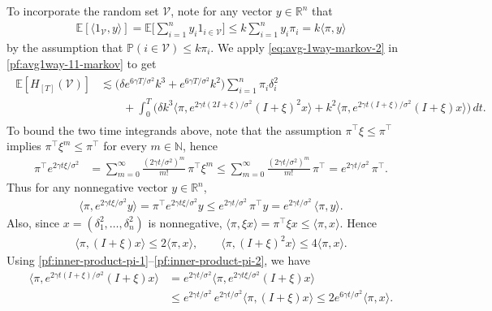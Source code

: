 \documentclass[11pt,reqno]{amsart}
\numberwithin{equation}{section}
\theoremstyle{definition}
\def\E{{\mathbb E}}
\def\N{{\mathbb N}}
\def\PP{{\mathbb P}}
\def\R{{\mathbb R}}
\def\V{{\mathcal V}}
\begin{document}
To incorporate the random set $\V$, note for any vector $y \in \R^n$ that
	\begin{align} \label{eq:avg-1way-markov-2}
		\E[\langle 1_{\V}, y \rangle ] = \E\Big[\sum_{i=1}^n y_i 1_{i\in\V}\Big] \le k \sum_{i=1}^n y_i \pi_i
		=k\langle\pi, y \rangle
	\end{align}
	by the assumption that $\PP(i\in\V)\le k\pi_i$.
	We apply \eqref{eq:avg-1way-markov-2} in \eqref{pf:avg1way-11-markov} to get
	\begin{align}\label{pf:avg-1way-precol-markov}
		\begin{split}
			\E[H_{[T]}(\V)]
			&\lesssim \big(\delta e^{6\gamma T/\sigma^2} k^3 + e^{6\gamma T/\sigma^2} k^2\big)  \sum_{i=1}^n \pi_i \delta_i^2\\
			&\qquad +  \int_0^T \bigg( \delta k^3 \big\langle \pi , e^{ 2\gamma  t (2I+\xi)/\sigma^2}(I+\xi)^2 x\big\rangle + k^2\big\langle \pi,  e^{2\gamma  t (I+\xi)/\sigma^2}(I+\xi) x \big\rangle \bigg)\,dt.
		\end{split}
	\end{align}
	To bound the two time integrands above, note that the assumption $\pi^\top \xi \le \pi^\top$ implies $\pi^\top \xi^m \le \pi^\top$ for every $m \in \N$, hence 
		\begin{align*}
			\pi^\top e^{2\gamma t \xi/\sigma^2}
			&= \sum_{m=0}^{\infty} \frac{(2\gamma t/\sigma^2)^m}{m!}\,\pi^\top \xi^m
			\le \sum_{m=0}^{\infty} \frac{(2\gamma t/\sigma^2)^m}{m!}\,\pi^\top
			= e^{2\gamma t/\sigma^2}\,\pi^\top.
		\end{align*}
		Thus for any nonnegative vector $y \in \R^n$, 
		\begin{align} \label{pf:inner-product-pi-1}
			\langle \pi, e^{2\gamma t \xi/\sigma^2} y \rangle
			= \pi^\top e^{2\gamma t \xi/\sigma^2} y
			\le e^{2\gamma t/\sigma^2}\,\pi^\top y
			= e^{2\gamma t/\sigma^2}\,\langle \pi, y \rangle.
		\end{align}
		Also, since $x=(\delta^2_1,\ldots,\delta^2_n)$ is nonnegative, $\langle \pi , \xi x\rangle  =  \pi^\top \xi x  \le \langle \pi, x \rangle$. Hence
		\begin{align}  \label{pf:inner-product-pi-2}
			\langle \pi, (I + \xi) x \rangle \le 2 \langle \pi, x \rangle,
			\qquad
			\langle \pi, (I+\xi)^2 x\rangle \le 4\langle \pi, x\rangle.
		\end{align} 
		Using \eqref{pf:inner-product-pi-1}--\eqref{pf:inner-product-pi-2}, we have
		\begin{align*}
			\big\langle \pi,  e^{2\gamma  t (I+\xi)/\sigma^2}(I+\xi) x \big\rangle
			&= e^{2\gamma t/\sigma^2}\big\langle \pi,  e^{2\gamma  t \xi/\sigma^2}(I+\xi) x \big\rangle \\
			&\le e^{2\gamma t/\sigma^2}\,e^{2\gamma t/\sigma^2}\big\langle \pi,  (I+\xi) x \big\rangle
			\le 2  e^{6\gamma t/\sigma^2} \langle \pi, x \rangle.
		\end{align*}
\end{document}
